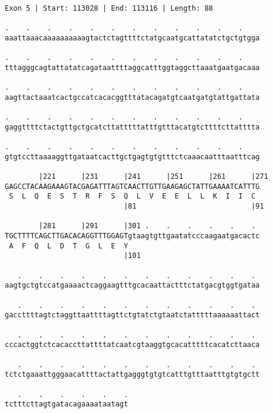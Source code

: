 \documentclass{article}
\begin{document}
\begin{Verbatim}[fontfamily=courier]
Exon 5 | Start: 113028 | End: 113116 | Length: 88

.    .    .    .    .    .    .    .    .    .    .    .    
aaattaaacaaaaaaaaaagtactctagttttctatgcaatgcattatatctgctgtgga

.    .    .    .    .    .    .    .    .    .    .    .    
tttagggcagtattatatcagataattttaggcatttggtaggcttaaatgaatgacaaa

.    .    .    .    .    .    .    .    .    .    .    .    
aagttactaaatcactgccatcacacggtttatacagatgtcaatgatgtattgattata

.    .    .    .    .    .    .    .    .    .    .    .    
gaggttttctactgttgctgcatcttatttttatttgtttacatgtcttttcttatttta

.    .    .    .    .    .    .    .    .    .    .    .    
gtgtccttaaaaggttgataatcacttgctgagtgtgtttctcaaacaatttaatttcag

        |221      |231      |241      |251      |261      |271
GAGCCTACAAGAAAGTACGAGATTTAGTCAACTTGTTGAAGAGCTATTGAAAATCATTTG
 S  L  Q  E  S  T  R  F  S  Q  L  V  E  E  L  L  K  I  I  C 
                            |81                           |91

        |281      |291      |301 .    .    .    .    .    . 
TGCTTTTCAGCTTGACACAGGTTTGGAGTgtaagtgttgaatatcccaagaatgacactc
 A  F  Q  L  D  T  G  L  E  Y                               
                            |101                            

   .    .    .    .    .    .    .    .    .    .    .    . 
aagtgctgtccatgaaaactcaggaagtttgcacaattactttctatgacgtggtgataa

   .    .    .    .    .    .    .    .    .    .    .    . 
gaccttttagtctaggttaattttagttctgtatctgtaatctatttttaaaaaattact

   .    .    .    .    .    .    .    .    .    .    .    . 
cccactggtctcacaccttattttatcaatcgtaaggtgcacatttttcacatcttaaca

   .    .    .    .    .    .    .    .    .    .    .    . 
tctctgaaattgggaacattttactattgagggtgtgtcatttgtttaatttgtgtgctt

   .    .    .    .    .    .
tctttcttagtgatacagaaaataatagt
\end{Verbatim}
\newpage
\end{document}
